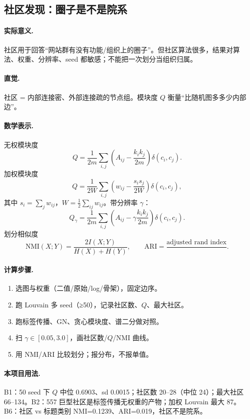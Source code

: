 \subsection{社区发现：圈子是不是院系}

\paragraph{实际意义.}
社区用于回答“网站群有没有功能/组织上的圈子”。但社区算法很多，结果对算法、权重、分辨率、seed 都敏感；不能把一次划分当组织归属。

\paragraph{直觉.}
社区 = 内部连接密、外部连接疏的节点组。模块度 \(Q\) 衡量“比随机图多多少内部边”。

\paragraph{数学表示.}
无权模块度
\[
Q=\frac{1}{2m}\sum_{i,j}\left(A_{ij}-\frac{k_i k_j}{2m}\right)\delta(c_i,c_j).
\]
加权模块度
\[
Q=\frac{1}{2W}\sum_{i,j}\left(w_{ij}-\frac{s_i s_j}{2W}\right)\delta(c_i,c_j),
\]
其中 \(s_i=\sum_j w_{ij}\)，\(W=\frac12\sum_{ij}w_{ij}\)。带分辨率 \(\gamma\)：
\[
Q_\gamma=\frac{1}{2m}\sum_{i,j}\left(A_{ij}-\gamma\frac{k_i k_j}{2m}\right)\delta(c_i,c_j).
\]
划分相似度
\[
\mathrm{NMI}(X;Y)=\frac{2I(X;Y)}{H(X)+H(Y)},\qquad
\mathrm{ARI}=\frac{\text{adjusted rand index}}{}.
\]

\paragraph{计算步骤.}
\begin{enumerate}
  \item 选图与权重（二值/原始/log/骨架），固定边序。
  \item 跑 Louvain 多 seed（≥50），记录社区数、\(Q\)、最大社区。
  \item 跑标签传播、GN、贪心模块度、谱二分做对照。
  \item 扫 \(\gamma\in[0.05,3.0]\)，画社区数/\(Q\)/NMI 曲线。
  \item 用 NMI/ARI 比较划分；报分布，不报单值。
\end{enumerate}

\paragraph{本项目用法.}
\unit{B1}：50 seed 下 \(Q\) 中位 0.6903、sd 0.0015；社区数 20--28（中位 24）；最大社区 66--134。\unit{B2}：557 巨型社区是标签传播无权重的产物；加权 Louvain 最大 87。\unit{B6}：社区 vs 标题类别 NMI=0.1239、ARI=0.019，社区不是院系。

